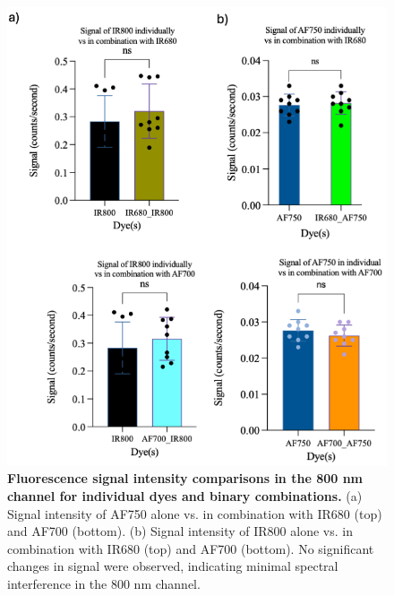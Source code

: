 \begin{figure}[H]
    \centering
    \begin{minipage}{\linewidth}
        \includegraphics[width=\linewidth]{figures/combo_800.png}
        \captionsetup{justification=raggedright, singlelinecheck=false}
        \caption[Combination experiments results in 800nm channel]{
            \textbf{Fluorescence signal intensity comparisons in the 800 nm channel for individual dyes and binary combinations.} 
            (a) Signal intensity of AF750 alone vs. in combination with IR680 (top) and AF700 (bottom). (b) Signal intensity of 
            IR800 alone vs. in combination with IR680 (top) and AF700 (bottom). No significant changes in signal were observed, 
            indicating minimal spectral interference in the 800 nm channel.
        }
        \label{fig:combo_800}
    \end{minipage}
\end{figure}
